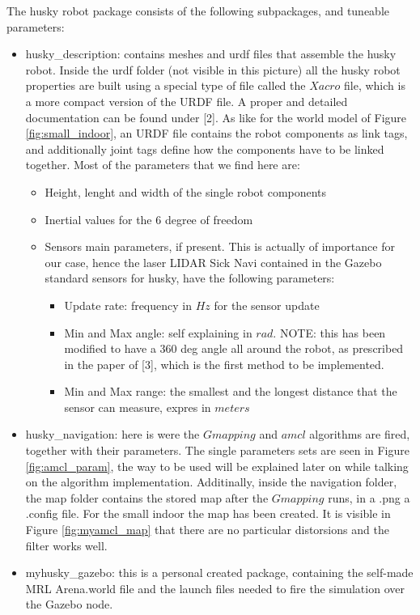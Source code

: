 \documentclass[11pt,a4paper]{article}
\begin{document}
The husky robot package consists of the following subpackages, and tuneable parameters:
\begin{itemize}
\item husky{\_}description: contains meshes and urdf files that assemble the husky robot. Inside the urdf folder (not visible in this picture) all the husky robot properties are built using a special type of file called the $Xacro$ file, which is a more compact version of the URDF file. A proper and detailed documentation can be found under [2]. As like for the world model of Figure \ref{fig:small_indoor}, an URDF file contains the robot components as link tags, and additionally joint tags define how the components have to be linked together. Most of the parameters that we find here are:
\begin{itemize}
\item Height, lenght and width of the single robot components
\item Inertial values for the 6 degree of freedom
\item Sensors main parameters, if present. This is actually of importance for our case, hence the laser LIDAR Sick Navi contained in the Gazebo standard sensors for husky, have the following parameters:
\begin{itemize}
\item Update rate: frequency in $Hz$ for the sensor update
\item Min and Max angle: self explaining in $rad$. NOTE: this has been modified to have a 360 deg angle all around the robot, as prescribed in the paper of [3], which is the first method to be implemented.
\item Min and Max range: the smallest and the longest distance that the sensor can measure, expres in $meters$
\end{itemize}
\end{itemize}

\item husky{\_}navigation: here is were the $Gmapping$ and $amcl$ algorithms are fired, together with their parameters. The single parameters sets are seen in Figure \ref{fig:amcl_param}, the way to be used will be explained later on while talking on the algorithm implementation. Additinally, inside the navigation folder, the map folder contains the stored map after the $Gmapping$ runs, in a .png a .config file. For the small indoor the map has been created. It is visible in Figure \ref{fig:myamcl_map} that there are no particular distorsions and the filter works well.

\item myhusky{\_}gazebo: this is a personal created package, containing the self-made MRL Arena.world file and the launch files needed to fire the simulation over the Gazebo node.
\end{itemize}
\end{document}
